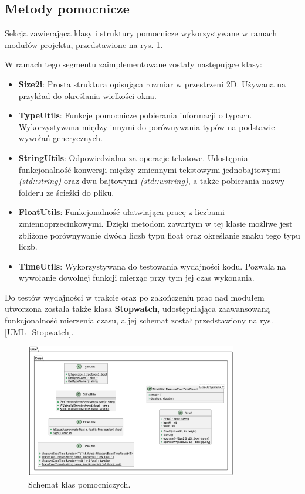 	
\subsection{Metody pomocnicze}
	Sekcja zawierająca klasy i struktury pomocnicze wykorzystywane w ramach modułów projektu, przedstawione na rys. \ref{UML_Utils}.
	
	W ramach tego segmentu zaimplementowane zostały następujące klasy:
	\begin{itemize}
		\item \textbf{Size2i}: Prosta struktura opisująca rozmiar w przestrzeni 2D. Używana na przykład do określania wielkości okna.
		\item \textbf{TypeUtils}: Funkcje pomocnicze pobierania informacji o typach. Wykorzystywana między innymi do porównywania typów na podstawie wywołań generycznych.
		\item \textbf{StringUtils}: Odpowiedzialna za operacje tekstowe. Udostępnia funkcjonalność konwersji między zmiennymi tekstowymi jednobajtowymi \textit{(std::string)} oraz dwu-bajtowymi \textit{(std::wstring)}, a także pobierania nazwy folderu ze ścieżki do pliku.
		\item \textbf{FloatUtils}: Funkcjonalność ułatwiająca pracę z liczbami zmiennoprzecinkowymi. Dzięki metodom zawartym w tej klasie możliwe jest zbliżone porównywanie dwóch liczb typu float oraz określanie znaku tego typu liczb.
		\item \textbf{TimeUtils}: Wykorzystywana do testowania wydajności kodu. Pozwala na wywołanie dowolnej funkcji mierząc przy tym jej czas wykonania.
	\end{itemize}

	Do testów wydajności w trakcie oraz po zakończeniu prac nad modułem utworzona została także klasa \textbf{Stopwatch}, udostępniająca zaawansowaną funkcjonalność mierzenia czasu, a jej schemat został przedstawiony na rys. \ref{UML_Stopwatch}.
	
	\vfill
	\clearpage
	
	\begin{figure}[h!]
		\centering
		\includegraphics[width=350px]{images/UML/utils.png}
		\caption{Schemat klas pomocniczych.}
		\label{UML_Utils}
	\end{figure}
	
